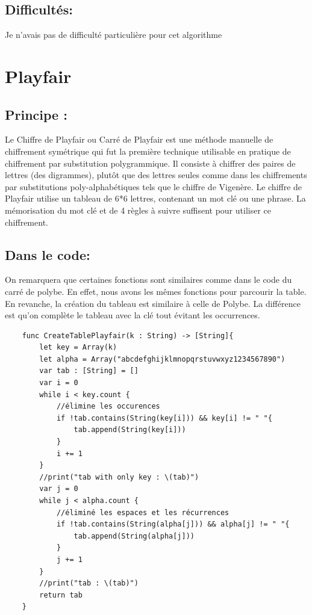 \documentclass{article}
\begin{document}
\subsection{Difficultés:}
Je n'avais pas de difficulté particulière pour cet algorithme 

\section{Playfair}
\subsection{Principe :}
Le Chiffre de Playfair ou Carré de Playfair est une méthode manuelle de chiffrement symétrique qui fut la première technique utilisable en pratique de chiffrement par substitution polygrammique.\newline
Il consiste à chiffrer des paires de lettres (des digrammes), plutôt que des lettres seules comme dans les chiffrements par substitutions poly-alphabétiques tels que le chiffre de Vigenère.\newline
Le chiffre de Playfair utilise un tableau de 6*6 lettres, contenant un mot clé ou une phrase. La mémorisation du mot clé et de 4 règles à suivre suffisent pour utiliser ce chiffrement.
\subsection{Dans le code:}
On remarquera que certaines fonctions sont similaires comme dans le code du carré de polybe. En effet, nous avons les mêmes fonctions pour parcourir la table.\newline
En revanche, la création du tableau est similaire à celle de Polybe. La différence est qu'on complète le tableau avec la clé tout évitant les occurrences.
\begin{verbatim}
    func CreateTablePlayfair(k : String) -> [String]{
        let key = Array(k)
        let alpha = Array("abcdefghijklmnopqrstuvwxyz1234567890")
        var tab : [String] = []
        var i = 0
        while i < key.count {
            //élimine les occurences
            if !tab.contains(String(key[i])) && key[i] != " "{ 
                tab.append(String(key[i]))
            }
            i += 1
        }
        //print("tab with only key : \(tab)")
        var j = 0
        while j < alpha.count {
            //éliminé les espaces et les récurrences
            if !tab.contains(String(alpha[j])) && alpha[j] != " "{ 
                tab.append(String(alpha[j]))
            }
            j += 1
        }
        //print("tab : \(tab)")
        return tab
    }
\end{verbatim}
\end{document}

